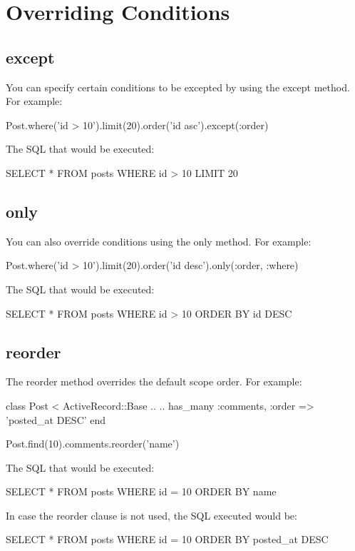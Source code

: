\documentclass[10pt]{book}
\newenvironment{code}{%
  \scriptsize
    \verbatim
}{%
    \endverbatim
    \newline
}
\begin{document}
\section{ Overriding Conditions}

\subsection{ except}

You can specify certain conditions to be excepted by using the except method. For example:
\begin{code}
Post.where('id > 10').limit(20).order('id asc').except(:order)
\end{code}

The SQL that would be executed:
\begin{code}
SELECT * FROM posts WHERE id > 10 LIMIT 20
\end{code}

\subsection{ only}

You can also override conditions using the only method. For example:
\begin{code}
Post.where('id > 10').limit(20).order('id desc').only(:order, :where)
\end{code}

The SQL that would be executed:
\begin{code}
SELECT * FROM posts WHERE id > 10 ORDER BY id DESC
\end{code}

\subsection{ reorder}

The reorder method overrides the default scope order. For example:
\begin{code}
class Post < ActiveRecord::Base
  ..
  ..
  has_many :comments, :order => 'posted_at DESC'
end
 
Post.find(10).comments.reorder('name')
\end{code}

The SQL that would be executed:
\begin{code}
SELECT * FROM posts WHERE id = 10 ORDER BY name
\end{code}

In case the reorder clause is not used, the SQL executed would be:
\begin{code}
SELECT * FROM posts WHERE id = 10 ORDER BY posted_at DESC
\end{code}
\end{document}
